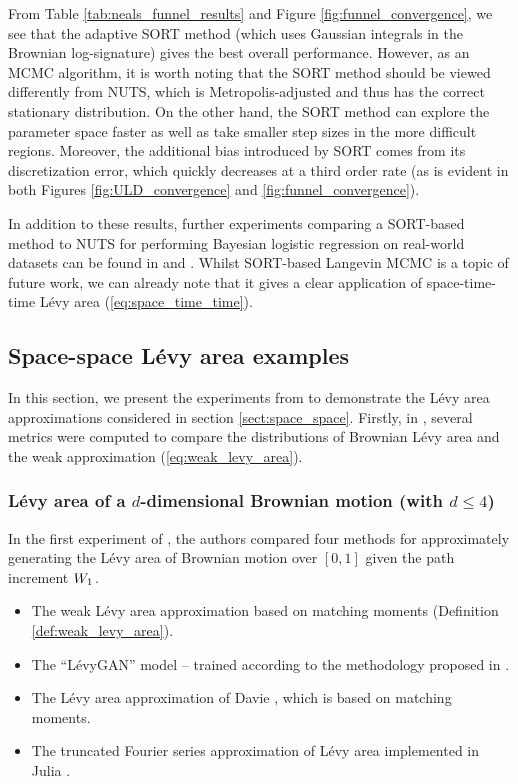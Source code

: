 \documentclass[sn-mathphys-num]{sn-jnl}%
\newcommand{\m}{\hspace{0.25mm}}
\begin{document}
From Table \ref{tab:neals_funnel_results} and Figure \ref{fig:funnel_convergence}, we see that the adaptive SORT method (which uses Gaussian integrals in the Brownian log-signature) gives the best overall performance. However, as an MCMC algorithm, it is worth noting that the SORT method should be viewed differently from NUTS, which is Metropolis-adjusted and thus has the correct stationary distribution. On the other hand, the SORT method can explore the parameter space faster as well as take smaller step sizes in the more difficult regions.
Moreover, the additional bias introduced by SORT comes from its discretization error, which quickly decreases at a third order rate (as is evident in both Figures \ref{fig:ULD_convergence} and \ref{fig:funnel_convergence}).\medbreak

In addition to these results, further experiments comparing a SORT-based method to NUTS \cite{hofttman2014nuts} for performing Bayesian logistic regression on real-world datasets can be found in \cite{jelincic2024vbt} and \cite{scott2025uld}. Whilst SORT-based Langevin MCMC is a topic of future work, we can already note that it gives a clear application of space-time-time L\'{e}vy area (\ref{eq:space_time_time}).

\subsection{Space-space L\'{e}vy area examples}\label{sect:ss_examples}

In this section, we present the experiments from \cite{jelincic2025levygan, foster2024adaptive} to demonstrate the L\'{e}vy area approximations considered in section \ref{sect:space_space}.
Firstly, in \cite{jelincic2025levygan}, several metrics were computed to compare the distributions of Brownian L\'{e}vy area and the weak approximation (\ref{eq:weak_levy_area}).

\subsubsection{L\'{e}vy area of a $d$-dimensional Brownian motion (with $d\leq 4$)}\label{sect:levy_experiments}

In the first experiment of \cite{jelincic2025levygan}, the authors compared four methods for approximately generating the L\'{e}vy area of Brownian motion over $[0,1]$ given the path increment $W_1\m$.
\begin{itemize}
\item The weak L\'{e}vy area approximation based on matching moments (Definition \ref{def:weak_levy_area}). \vspace{0.5mm}
\item The ``L\'{e}vyGAN'' model -- trained according to the methodology proposed in \cite{jelincic2025levygan}. \vspace{0.5mm}
\item The L\'{e}vy area approximation of Davie \cite{davie2014area}, which is based on matching moments. \vspace{0.5mm}
\item The truncated Fourier series approximation of L\'{e}vy area implemented in Julia \cite{kastner2023julia}.
\end{itemize}
\end{document}
